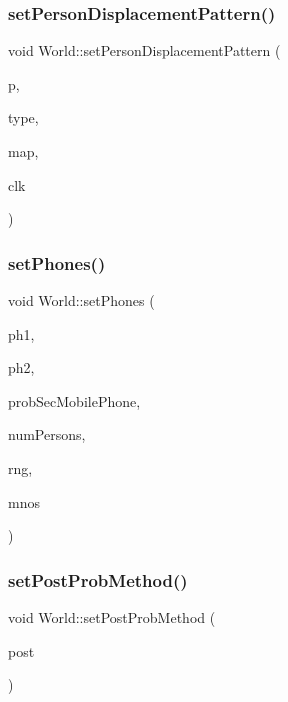 \subsubsection{\texorpdfstring{set\+Person\+Displacement\+Pattern()}{setPersonDisplacementPattern()}}
{\footnotesize\ttfamily void World\+::set\+Person\+Displacement\+Pattern (\begin{DoxyParamCaption}\item[{\hyperlink{class_person}{Person} $\ast$}]{p,  }\item[{\hyperlink{_movement_type_8h_a8a93b61bc797a7d1907f42796a252493}{Movement\+Type}}]{type,  }\item[{\hyperlink{class_map}{Map} $\ast$}]{map,  }\item[{\hyperlink{class_clock}{Clock} $\ast$}]{clk }\end{DoxyParamCaption})\hspace{0.3cm}{\ttfamily [private]}}

\mbox{\label{class_world_a823ee4f34344e80a028e95211b258e7b}} 
\subsubsection{\texorpdfstring{set\+Phones()}{setPhones()}}
{\footnotesize\ttfamily void World\+::set\+Phones (\begin{DoxyParamCaption}\item[{int $\ast$\&}]{ph1,  }\item[{int $\ast$\&}]{ph2,  }\item[{double}]{prob\+Sec\+Mobile\+Phone,  }\item[{double}]{num\+Persons,  }\item[{\hyperlink{class_random_number_generator}{Random\+Number\+Generator} $\ast$}]{rng,  }\item[{vector$<$ \hyperlink{class_mobile_operator}{Mobile\+Operator} $\ast$$>$}]{mnos }\end{DoxyParamCaption})\hspace{0.3cm}{\ttfamily [private]}}

\mbox{\label{class_world_a176205a2d3e28cca6fb7ac2fc9e8670e}} 
\subsubsection{\texorpdfstring{set\+Post\+Prob\+Method()}{setPostProbMethod()}}
{\footnotesize\ttfamily void World\+::set\+Post\+Prob\+Method (\begin{DoxyParamCaption}\item[{const std\+::shared\+\_\+ptr$<$ \hyperlink{class_post_loc_prob}{Post\+Loc\+Prob} $>$ \&}]{post }\end{DoxyParamCaption})}

